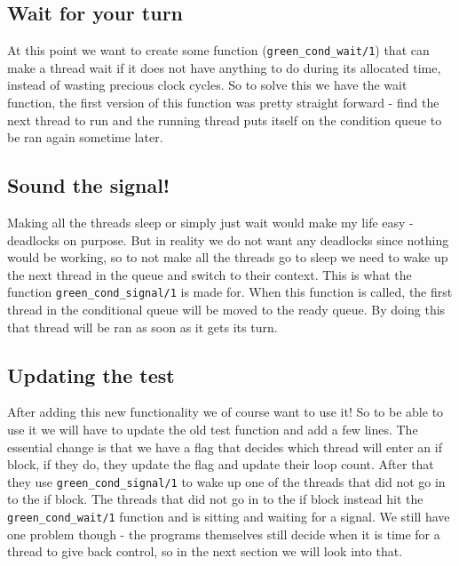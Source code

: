 \documentclass[a4paper, 12pt]{article}
\def\code#1{\texttt{#1}}
\begin{document}
\subsection{Wait for your turn}
At this point we want to create some function (\code{green\_cond\_wait/1}) that can make a thread wait if it does not have anything to do during its allocated time, instead of wasting precious clock cycles. So to solve this we have the wait function, the first version of this function was pretty straight forward - find the next thread to run and the running thread puts itself on the condition queue to be ran again sometime later.

\subsection{Sound the signal!}
Making all the threads sleep or simply just wait would make my life easy - deadlocks on purpose. But in reality we do not want any deadlocks since nothing would be working, so to not make all the threads go to sleep we need to wake up the next thread in the queue and switch to their context. This is what the function \code{green\_cond\_signal/1} is made for. When this function is called, the first thread in the conditional queue will be moved to the ready queue. By doing this that thread will be ran as soon as it gets its turn.

\subsection{Updating the test}
After adding this new functionality we of course want to use it! So to be able to use it we will have to update the old test function and add a few lines. The essential change is that we have a flag that decides which thread will enter an if block, if they do, they update the flag and update their loop count. After that they use \code{green\_cond\_signal/1} to wake up one of the threads that did not go in to the if block. The threads that did not go in to the if block instead hit the \code{green\_cond\_wait/1} function and is sitting and waiting for a signal. We still have one problem though - the programs themselves still decide when it is time for a thread to give back control, so in the next section we will look into that.
\end{document}

